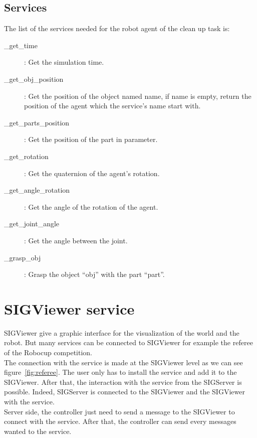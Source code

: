 \subsection{Services}
The list of the services needed for the robot agent of the clean up task is:
\begin{description}
	\item[\_get\_time] : Get the simulation time.
	\item[\_get\_obj\_position] : Get the position of the object named name, if name is empty, return the position of the agent which the service's name start with.
	\item[\_get\_parts\_position] : Get the position of the part in parameter.
	\item[\_get\_rotation] : Get the quaternion of the agent's rotation.
	\item[\_get\_angle\_rotation] : Get the angle of the rotation of the agent.
	\item[\_get\_joint\_angle]: Get the angle between the joint.
	\item[\_grasp\_obj]: Grasp the object ``obj'' with the part ``part''.
\end{description}


\section{SIGViewer service}
SIGViewer give a graphic interface for the visualization of the world and the robot. But many services can be connected to SIGViewer for example the referee of the Robocup competition.\\
The connection with the service is made at the SIGViewer level as we can see figure~\ref{fig:referee}. The user only has to install the service and add it to the SIGViewer. After that, the interaction with the service from the SIGServer is possible. Indeed, SIGServer is connected to the SIGViewer and the SIGViewer with the service.\\
Server side, the controller just need to send a message to the SIGViewer to connect with the service. After that, the controller can send every messages wanted to the service.\\

